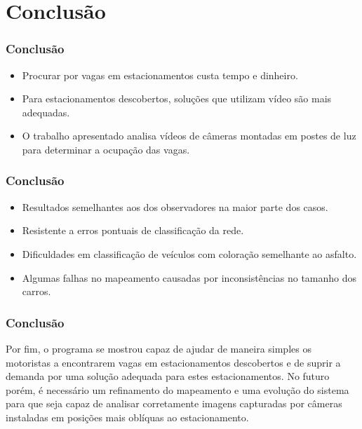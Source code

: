\documentclass{beamer}
\begin{document}
\section{Conclusão}
\begin{frame}
\frametitle{Conclusão}

\begin{itemize}
	\item Procurar por vagas em estacionamentos custa tempo e dinheiro.
	\item Para estacionamentos descobertos, soluções que utilizam vídeo são mais adequadas.
	\item O trabalho apresentado analisa vídeos de câmeras montadas em postes de luz para determinar a ocupação das vagas.
\end{itemize}
\end{frame}

\begin{frame}
	\frametitle{Conclusão}
	\begin{itemize}
		\item Resultados semelhantes aos dos observadores na maior parte dos casos.
		\item Resistente a erros pontuais de classificação da rede.
		\item Dificuldades em classificação de veículos com coloração semelhante ao asfalto.
		\item Algumas falhas no mapeamento causadas por inconsistências no tamanho dos carros.
	\end{itemize}
\end{frame}

\begin{frame}
	\frametitle{Conclusão}
	\begin{block}{}
		Por fim, o programa se mostrou capaz de ajudar de maneira simples os motoristas a encontrarem vagas em estacionamentos descobertos e de suprir a demanda por uma solução adequada para estes estacionamentos. No futuro porém, é necessário um refinamento do mapeamento e uma evolução do sistema para que seja capaz de analisar corretamente imagens capturadas por câmeras instaladas em posições mais oblíquas ao estacionamento.
	\end{block}
\end{frame}
\end{document}
